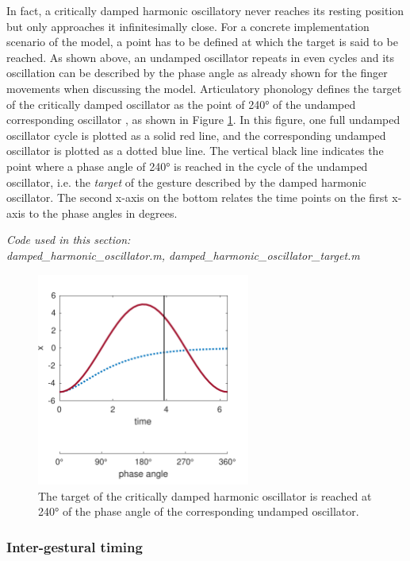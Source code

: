 In fact, a critically damped harmonic oscillatory never reaches its resting position but only approaches it infinitesimally close. For a concrete implementation scenario of the model, a point has to be defined at which the target is said to be reached. As shown above, an undamped oscillator repeats in even cycles and its oscillation can be described by the phase angle as already shown for the finger movements when discussing the \citet{HakenKelsoBunz1985} model. Articulatory phonology defines the target of the critically damped oscillator as the point of 240° of the undamped corresponding oscillator \citep{BrowmanGoldstein1990}, as shown in Figure \ref{fig:dho_240}. In this figure, one full undamped oscillator cycle is plotted as a solid red line, and the corresponding undamped oscillator is plotted as a dotted blue line. The vertical black line indicates the point where a phase angle of 240° is reached in the cycle of the undamped oscillator, i.e. the \emph{target} of the gesture described by the damped harmonic oscillator. The second x-axis on the bottom relates the time points on the first x-axis to the phase angles in degrees.

\medskip\noindent\textit{Code used in this section: \\
damped\_harmonic\_oscillator.m, damped\_harmonic\_oscillator\_target.m}

\begin{figure}[htp]
\begin{center}
\includegraphics[width=7cm]{figures/ch3/target_240_degrees.pdf}
\caption{The target of the critically damped harmonic oscillator is reached at 240° of the phase angle of the corresponding undamped oscillator.}
\label{fig:dho_240}
\end{center}
\end{figure}

\subsubsection{Inter-gestural timing}

